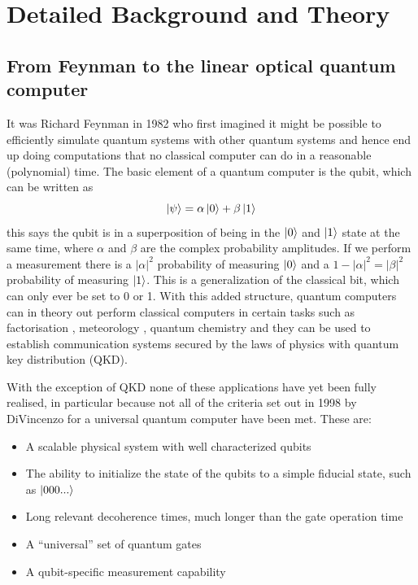 \newpage
\section{Detailed Background and Theory}
\subsection{From Feynman to the linear optical quantum computer}
It was Richard Feynman in 1982\cite{feynman_simulating_1982} who first imagined it might be possible to efficiently simulate quantum systems with other quantum systems and hence end up doing computations that no classical computer can do in a reasonable (polynomial) time. The basic element of a quantum computer is the qubit, which can be written as
\begin{equation}
\ket{\psi}=\alpha \ket{0}+\beta\ket{1}
\end{equation}
this says the qubit is in a superposition of being in the $\ket{0}$ and $\ket{1}$ state at the same time, where $\alpha$ and $\beta$ are the complex probability amplitudes. If we perform a measurement there is a $|\alpha|^2$ probability of measuring $\ket{0}$ and a $1-|\alpha|^2=|\beta|^2$ probability of measuring $\ket{1}$. This is a generalization of the classical bit, which can only ever be set to 0 or 1. With this added structure, quantum computers can in theory out perform classical computers in certain tasks such as factorisation \cite{shor_polynomial-time_1995}, meteorology \cite{toth_quantum_2014}, quantum chemistry\cite{georgescu_quantum_2014} and they can be used to establish communication systems secured by the laws of physics with quantum key distribution (QKD)\cite{zhang_reference-frame-independent_2014}.

With the exception of QKD none of these applications have yet been fully realised, in particular because not all of the criteria  \cite{divincenzo_quantum_1998} set out in 1998 by DiVincenzo for a universal quantum  computer have been met. These are:
\begin{itemize}
	\item A scalable physical system with well characterized
qubits
	\item The ability to initialize the state of the qubits to a
simple fiducial state, such as $\ket{000...}$
	\item Long relevant decoherence times, much longer than
the gate operation time
	\item A “universal” set of quantum gates
	\item A qubit-specific measurement capability
\end{itemize}

